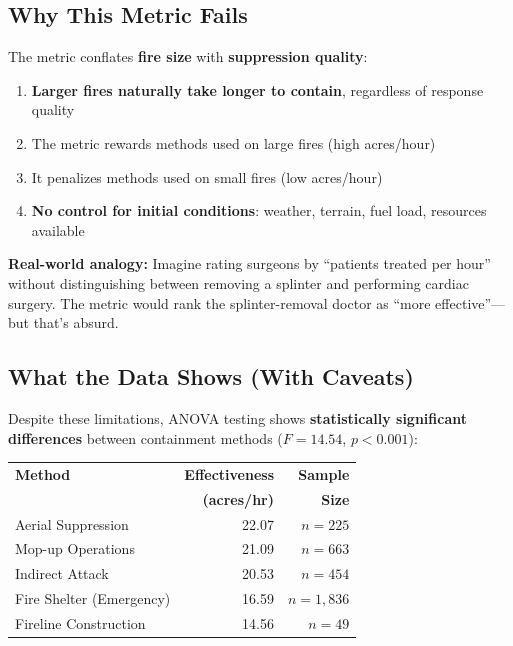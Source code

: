 \documentclass[11pt,a4paper]{article}
\begin{document}
\subsection{Why This Metric Fails}

The metric conflates \textbf{fire size} with \textbf{suppression quality}:

\begin{enumerate}
    \item \textbf{Larger fires naturally take longer to contain}, regardless of response quality
    \item The metric rewards methods used on large fires (high acres/hour)
    \item It penalizes methods used on small fires (low acres/hour)
    \item \textbf{No control for initial conditions}: weather, terrain, fuel load, resources available
\end{enumerate}

\textbf{Real-world analogy:} Imagine rating surgeons by ``patients treated per hour'' without distinguishing between removing a splinter and performing cardiac surgery. The metric would rank the splinter-removal doctor as ``more effective''---but that's absurd.

\subsection{What the Data Shows (With Caveats)}

Despite these limitations, ANOVA testing shows \textbf{statistically significant differences} between containment methods ($F = 14.54$, $p < 0.001$):

\begin{center}
\begin{tabular}{lrr}
\toprule
\textbf{Method} & \textbf{Effectiveness} & \textbf{Sample} \\
 & \textbf{(acres/hr)} & \textbf{Size} \\
\midrule
Aerial Suppression & 22.07 & $n=225$ \\
Mop-up Operations & 21.09 & $n=663$ \\
Indirect Attack & 20.53 & $n=454$ \\
Fire Shelter (Emergency) & 16.59 & $n=1,836$ \\
Fireline Construction & 14.56 & $n=49$ \\
\bottomrule
\end{tabular}
\end{center}
\end{document}
